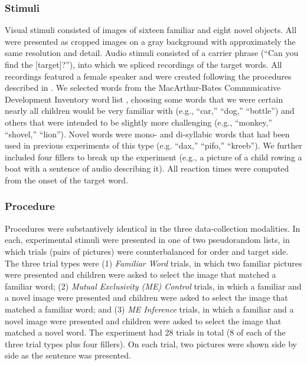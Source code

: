 \documentclass[man,noapacite]{apa2}
\begin{document}
\subsubsection{Stimuli}

Visual stimuli consisted of images of sixteen familiar and eight novel objects. All were presented as cropped images on a gray background with approximately the same resolution and detail.  Audio stimuli consisted of a carrier phrase (``Can you find the [target]?''), into which we spliced recordings of the target words. All recordings featured a female speaker and were created following the procedures described in . We selected words from the MacArthur-Bates Communicative Development Inventory word list \cite{fenson1994,fenson2007}, choosing some words that we were certain nearly all children would be very familiar with (e.g., ``car,'' ``dog,'' ``bottle'') and others that were intended to be slightly more challenging (e.g., ``monkey,'' ``shovel,'' ``lion''). Novel words were mono- and di-syllabic words that had been used in previous experiments of this type (e.g. ``dax,'' ``pifo,'' ``kreeb''). We further included four fillers to break up the experiment (e.g., a picture of a child rowing a boat with a sentence of audio describing it). All reaction times were computed from the onset of the target word. 

\subsubsection{Procedure}

Procedures were substantively identical in the three data-collection modalities. In each, experimental stimuli were presented in one of two pseudorandom lists, in which trials (pairs of pictures) were counterbalanced for order and target side. The three trial types were (1) \emph{Familiar Word} trials, in which two familiar pictures were presented and children were asked to select the image that matched a familiar word; (2) \emph{Mutual Exclusivity (ME) Control} trials, in which a familiar and a novel image were presented and children were asked to select the image that matched a familiar word; and (3) \emph{ME Inference} trials, in which a familiar and a novel image were presented and children were asked to select the image that matched a novel word. The experiment had 28 trials in total (8 of each of the three trial types plus four fillers). On each trial, two pictures were shown side by side as the sentence was presented.
\end{document}
